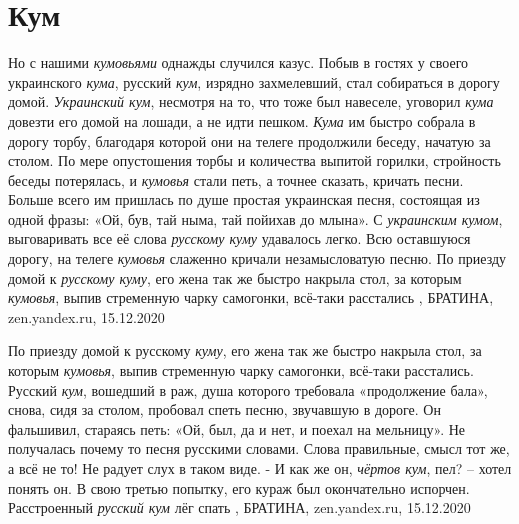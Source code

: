  
 
 
 
 
\chapter{Кум}
\label{sec:slova.kum}

Но с нашими \emph{кумовьями} однажды случился казус. Побыв в гостях у своего
украинского \emph{кума}, русский \emph{кум}, изрядно захмелевший, стал
собираться в дорогу домой. \emph{Украинский кум}, несмотря на то, что тоже был
навеселе, уговорил \emph{кума} довезти его домой на лошади, а не идти пешком.
\emph{Кума} им быстро собрала в дорогу торбу, благодаря которой они на телеге
продолжили беседу, начатую за столом. По мере опустошения торбы и количества
выпитой горилки, стройность беседы потерялась, и \emph{кумовья} стали петь, а
точнее сказать, кричать песни. Больше всего им пришлась по душе простая
украинская песня, состоящая из одной фразы: «Ой, був, тай ныма, тай пойихав до
млына». С \emph{украинским кумом}, выговаривать все её слова \emph{русскому
куму} удавалось легко. Всю оставшуюся дорогу, на телеге \emph{кумовья} слаженно
кричали незамысловатую песню.  По приезду домой к \emph{русскому куму}, его
жена так же быстро накрыла стол, за которым \emph{кумовья}, выпив стременную
чарку самогонки, всё-таки расстались
, 
БРАТИНА, zen.yandex.ru, 15.12.2020

По приезду домой к русскому \emph{куму}, его жена так же быстро накрыла стол, за
которым \emph{кумовья}, выпив стременную чарку самогонки, всё-таки расстались. Русский
\emph{кум}, вошедший в раж, душа которого требовала «продолжение бала», снова, сидя за
столом, пробовал спеть песню, звучавшую в дороге. Он фальшивил, стараясь петь:
«Ой, был, да и нет, и поехал на мельницу». Не получалась почему то песня
русскими словами. Слова правильные, смысл тот же, а всё не то! Не радует слух в
таком виде.  - И как же он, \emph{чёртов кум}, пел? – хотел понять он.  В свою третью
попытку, его кураж был окончательно испорчен. Расстроенный \emph{русский кум} лёг
спать
, 
БРАТИНА, zen.yandex.ru, 15.12.2020

